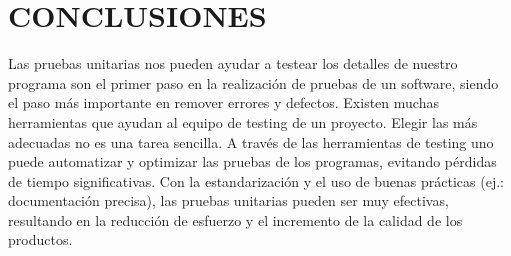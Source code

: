\section{CONCLUSIONES}
Las pruebas unitarias nos pueden ayudar a testear los detalles de nuestro programa son el primer paso en la realización de pruebas de un software, siendo el paso más importante en remover errores y defectos.
Existen muchas herramientas que ayudan al equipo de testing de un proyecto. Elegir las más adecuadas no es una tarea sencilla.
A través de las herramientas de testing uno puede automatizar y optimizar las pruebas de los programas, evitando pérdidas de tiempo significativas.
Con la estandarización y el uso de buenas prácticas (ej.: documentación precisa), las pruebas unitarias pueden ser muy efectivas, resultando en la reducción de esfuerzo y el incremento de la calidad de los productos. 



